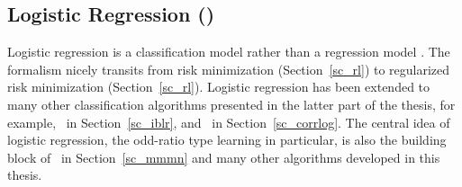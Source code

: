 {\fi




%
% 
\subsection{Logistic Regression (\lr)}\label{sc_lr}

Logistic regression is a classification model rather than a regression model \citep{Bishop07}.
The formalism nicely transits from risk minimization (Section~\ref{sc_rl}) to regularized risk minimization (Section~\ref{sc_rl}).
Logistic regression has been extended to many other classification algorithms presented in the latter part of the thesis, for example, \iblr\ in Section~\ref{sc_iblr}, and \corrlog\ in Section~\ref{sc_corrlog}.
The central idea of logistic regression, the odd-ratio type learning in particular, is also the building block of \mmmn\ in Section~\ref{sc_mmmn} and many other algorithms developed in this thesis.

}
